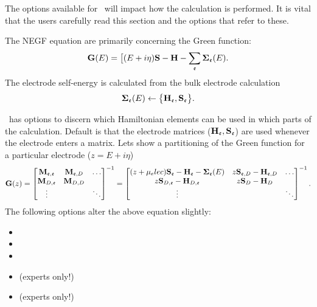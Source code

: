 The options available for \tsiesta\ will impact how the calculation
is performed. It is vital that the users carefully read this section
and the options that refer to these.

The NEGF equation are primarily concerning the Green function:
\begin{equation}
  \label{eq:negf:green}
  \G(E) = \big[ (E+i\eta)\SO - \Ham - \sum_\elec \SE_\elec(E).
\end{equation}
The electrode self-energy is calculated from the bulk electrode
calculation
\begin{equation}
  \boldsymbol{\Sigma}_{\mathfrak{e}}(E) \leftarrow \big\{\textbf{H}_{\mathfrak{e}}, \textbf{S}_{\mathfrak{e}}\big\}.
\end{equation}

\tsiesta\ has options to discern which Hamiltonian elements can be
used in which parts of the calculation.
Default is that the electrode matrices ($\textbf{H}_{\mathfrak{e}}, \textbf{S}_{\mathfrak{e}}$) are
used whenever the electrode enters a matrix. Lets show a partitioning
of the Green function for a particular electrode ($z=E+i\eta$)
\begin{equation}
  \label{eq:negf:green-elec}
  \G(z) =
  \begin{bmatrix}
    \mathbf M_{\elec,\elec} & \mathbf M_{\elec, D} & \dots
    \\
    \mathbf M_{D,\elec} & \mathbf M_{D, D} &
    \\
    \vdots && \ddots
    \\
  \end{bmatrix}^{-1}=
  \begin{bmatrix}
    (z+\mu_elec)\SO_\elec - \Ham_\elec - \SE_\elec(E) & z\SO_{\elec,D} - \Ham_{\elec,D} & \dots
    \\
    z\SO_{D,\elec} - \Ham_{D,\elec} & z\SO_D - \Ham_D &
    \\
    \vdots & & \ddots
    \\
  \end{bmatrix}^{-1}.
\end{equation}
The following options alter the above equation slightly:
\begin{itemize}
  \item {}
  \item {}
  \item {}
  \item {} (experts only!)
  \item {} (experts only!)
\end{itemize}
